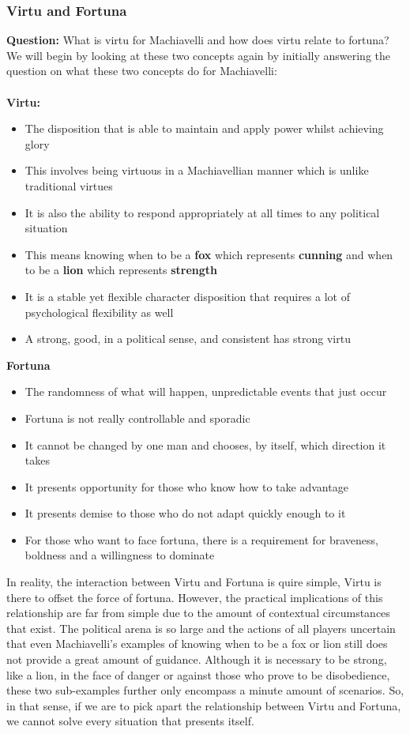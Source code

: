 \documentclass[12pt, letterpaper]{article}
\begin{document}
\subsubsection{Virtu and Fortuna}
\textbf{Question:} What is virtu for Machiavelli and how does virtu relate to fortuna?\\
We will begin by looking at these two concepts again by initially answering the question on what these two concepts do for Machiavelli:\\\\
\textbf{Virtu:}
\begin{itemize}
	\item The disposition that is able to maintain and apply power whilst achieving glory
	\item This involves being virtuous in a Machiavellian manner which is unlike traditional virtues
	\item It is also the ability to respond appropriately at all times to any political situation
	\item This means knowing when to be a \textbf{fox} which represents \textbf{cunning} and when to be a \textbf{lion} which represents \textbf{strength}
	\item It is a stable yet flexible character disposition that requires a lot of psychological flexibility as well
	\item A strong, good, in a political sense, and consistent has strong virtu
\end{itemize}
\textbf{Fortuna}
\begin{itemize}
	\item The randomness of what will happen, unpredictable events that just occur
	\item Fortuna is not really controllable and sporadic
	\item It cannot be changed by one man and chooses, by itself, which direction it takes
	\item It presents opportunity for those who know how to take advantage 
	\item It presents demise to those who do not adapt quickly enough to it
	\item For those who want to face fortuna, there is a requirement for braveness, boldness and a willingness to dominate
\end{itemize}
In reality, the interaction between Virtu and Fortuna is quire simple, Virtu is there to offset the force of fortuna. However, the practical implications of this relationship are far from simple due to the amount of contextual circumstances that exist. The political arena is so large and the actions of all players uncertain that even Machiavelli's examples of knowing when to be a fox or lion still does not provide a great amount of guidance. Although it is necessary to be strong, like a lion,  in the face of danger or against those who prove to be disobedience, these two sub-examples further only encompass a minute amount of scenarios. So, in that sense, if we are to pick apart the relationship between Virtu and Fortuna, we cannot solve every situation that presents itself.
\end{document}
